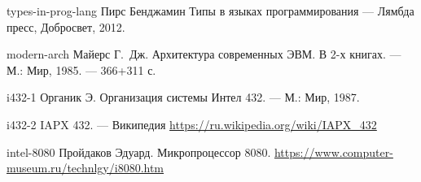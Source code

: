 \begin{thebibliography}{00}
\bibitem
{types-in-prog-lang}
Пирс Бенджамин
Типы в языках программирования
--- Лямбда пресс, Добросвет, 2012.

\bibitem
{modern-arch}
Майерс Г.~Дж.
Архитектура современных ЭВМ. В 2-х книгах.
--- М.: Мир, 1985.
--- 366+311 с.

\bibitem
{i432-1}
Органик Э.
Организация системы Интел 432. 
--- М.: Мир, 1987.

\bibitem
{i432-2}
IAPX 432.
--- Википедия
\url{https://ru.wikipedia.org/wiki/IAPX_432}

\bibitem
{intel-8080}
Пройдаков Эдуард.
Микропроцессор 8080.
\url{https://www.computer-museum.ru/technlgy/i8080.htm}


\end{thebibliography}
